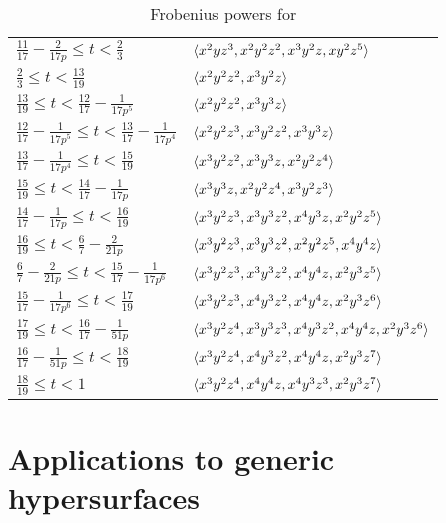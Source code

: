 \documentclass{amsart}
\begin{document}
\begin{example}
\begin{table}
\begin{center}
\begin{tabular}{ll}
        $\frac{11}{17} - \frac2{17 p} \le t < \frac23$ & $\langle x^2yz^3, x^2y^2z^2, x^3y^2z, xy^2z^5 \rangle$ \\
        $\frac23 \le t < \frac{13}{19}$ & $\langle x^2y^2z^2, x^3y^2z \rangle$ \\
        $\frac{13}{19} \le t < \frac{12}{17} - \frac1{17 p^5}$ & $\langle x^2y^2z^2, x^3y^3z \rangle$ \\
        $\frac{12}{17} - \frac1{17 p^5} \le t < \frac{13}{17} - \frac1{17 p^4}$ & $\langle x^2y^2z^3, x^3y^2z^2, x^3y^3z \rangle$ \\
        $\frac{13}{17} - \frac1{17 p^4} \le t < \frac{15}{19}$ & $\langle x^3y^2z^2, x^3y^3z, x^2y^2z^4 \rangle$ \\
        $\frac{15}{19} \le t < \frac{14}{17} - \frac1{17 p}$ & $\langle x^3y^3z, x^2y^2z^4, x^3y^2z^3 \rangle$ \\
        $\frac{14}{17} - \frac1{17 p} \le t < \frac{16}{19}$ & $\langle x^3y^2z^3, x^3y^3z^2, x^4y^3z, x^2y^2z^5 \rangle$ \\
        $\frac{16}{19} \le t < \frac67 - \frac2{21 p}$ & $\langle x^3y^2z^3, x^3y^3z^2, x^2y^2z^5, x^4y^4z \rangle$ \\
        $\frac67 - \frac2{21 p} \le t < \frac{15}{17} - \frac1{17 p^6}$ & $\langle x^3y^2z^3, x^3y^3z^2, x^4y^4z, x^2y^3z^5 \rangle$ \\
        $\frac{15}{17} - \frac1{17 p^6} \le t < \frac{17}{19}$ & $\langle x^3y^2z^3, x^4y^3z^2, x^4y^4z, x^2y^3z^6 \rangle$ \\
        $\frac{17}{19} \le t < \frac{16}{17} - \frac1{51 p}$ & $\langle x^3y^2z^4, x^3y^3z^3, x^4y^3z^2, x^4y^4z, x^2y^3z^6 \rangle$ \\
        $\frac{16}{17} - \frac1{51 p} \le t < \frac{18}{19}$ & $\langle x^3y^2z^4, x^4y^3z^2, x^4y^4z, x^2y^3z^7 \rangle$ \\
        $\frac{18}{19} \le t < 1$ & $\langle x^3y^2z^4, x^4y^4z, x^4y^3z^3, x^2y^3z^7 \rangle$ \\
        \bottomrule
      \end{tabular}
      \endgroup
   \end{center}
   \caption{Frobenius powers for }
   \label{table: main example}
\end{table}
\end{example}




\section{Applications to generic hypersurfaces}
\label{generic-hypersurfaces: S}
\end{document}
